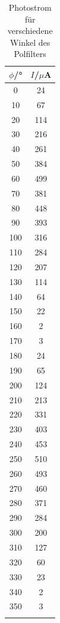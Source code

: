\begin{longtable}[H]{c c}
			\toprule
			\(\phi\)/° & \(I\)/\(\mu\)A \\
			\midrule
			0       &24\\
			10      &67\\
			20      &114\\
			30      &216\\
			40      &261\\
			50      &384\\
			60      &499\\
			70      &381\\
			80      &448\\
			90      &393\\
			100     &316\\
			110     &284\\
			120     &207\\
			130     &114\\
			140     &64\\
			150     &22\\
			160     &2\\
			170     &3\\
			180     &24\\
			190     &65\\
			200     &124\\
			210     &213\\
			220     &331\\
			230     &403\\
			240     &453\\
			250     &510\\
			260     &493\\
			270     &460\\
			280     &371\\
			290     &284\\
			300     &200\\
			310     &127\\
			320     &60\\
			330     &23\\                                                                                            
			340     &2\\                                                                                         
			350     &3\\
			\bottomrule
		\caption{Photostrom für verschiedene Winkel des Polfilters}
		\label{tab:t4}
\end{longtable}

